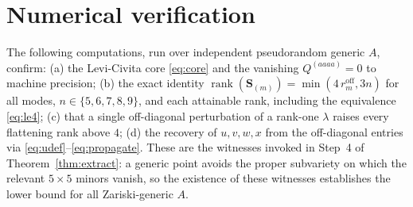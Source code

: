 \appendix
\section{Numerical verification}

The following computations, run over independent pseudorandom generic $A$, confirm:
(a) the Levi-Civita core \eqref{eq:core} and the vanishing $Q^{(aaaa)}=0$ to machine
precision;
(b) the exact identity $\operatorname{rank}(\mathbf S_{(m)})=\min(4\,r_m^{\mathrm{off}},3n)$
for all modes, $n\in\{5,6,7,8,9\}$, and each attainable rank, including the equivalence
\eqref{eq:le4};
(c) that a single off-diagonal perturbation of a rank-one $\lambda$ raises every
flattening rank above $4$;
(d) the recovery of $u,v,w,x$ from the off-diagonal entries via \eqref{eq:udef}–\eqref{eq:propagate}.
These are the witnesses invoked in Step~4 of Theorem~\ref{thm:extract}: a generic point
avoids the proper subvariety on which the relevant $5\times5$ minors vanish, so the
existence of these witnesses establishes the lower bound for all Zariski-generic $A$.


